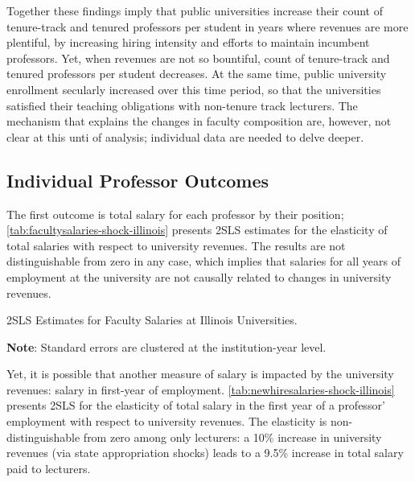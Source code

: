 \documentclass[notitlepage,12pt]{article}
\begin{document}
Together these findings imply that public universities increase their count of tenure-track and tenured professors per student in years where revenues are more plentiful, by increasing hiring intensity and efforts to maintain incumbent professors.
Yet, when revenues are not so bountiful, count of tenure-track and tenured professors per student decreases.
At the same time, public university enrollment secularly increased over this time period, so that the universities satisfied their teaching obligations with non-tenure track lecturers.
The mechanism that explains the changes in faculty composition are, however, not clear at this unti of analysis; individual data are needed to delve deeper.


\subsection{Individual Professor Outcomes}

The first outcome is total salary for each professor by their position;
\autoref{tab:facultysalaries-shock-illinois} presents 2SLS estimates for the elasticity of total salaries with respect to university revenues.
The results are not distinguishable from zero in any case, which implies that salaries for all years of employment at the university are not causally related to changes in university revenues.

\begin{table}[!h]
    \onehalfspacing
    \centering
    \caption{2SLS Estimates for Faculty Salaries at Illinois Universities.}
    \makebox[\textwidth][c]{}
    \begin{flushleft}
        \footnotesize
        \textbf{Note}: Standard errors are clustered at the institution-year level.
    \end{flushleft}
    \label{tab:facultysalaries-shock-illinois}
\end{table}

Yet, it is possible that another measure of salary is impacted by the university revenues: salary in first-year of employment.
\autoref{tab:newhiresalaries-shock-illinois} presents 2SLS for the elasticity of total salary in the first year of a professor' employment  with respect to university revenues.
The elasticity is non-distinguishable from zero among only lecturers: a 10\% increase in university revenues (via state appropriation shocks) leads to a 9.5\% increase in total salary paid to lecturers.
\end{document}
